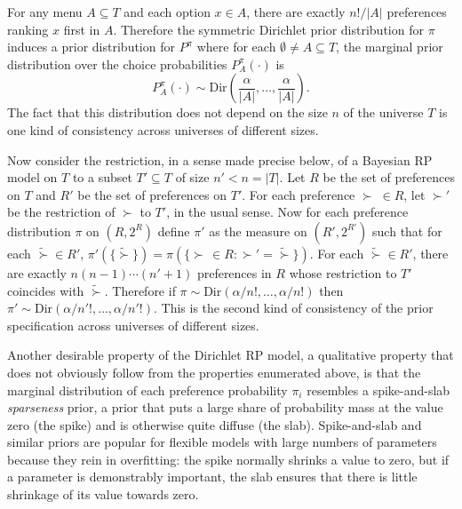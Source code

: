 \documentclass[11pt,letter]{article}
\newcommand{\Dpi}{Dirichlet RP model}
\begin{document}
For any menu $A \subseteq T$ and each option $x \in A$, there are exactly $n!/|A|$ preferences ranking $x$ first in $A$.
Therefore the symmetric Dirichlet prior distribution for $\pi$ induces a prior distribution for $P^\pi$ where for each $\emptyset \neq A \subseteq T$, the marginal prior distribution over the choice probabilities $P^\pi_A(\cdot)$ is
\begin{equation}\label{e:DirP}
  P^\pi_A(\cdot) \sim \mathrm{Dir}\left( \frac{\alpha}{|A|}, \ldots, \frac{\alpha}{|A|} \right).
\end{equation}
The fact that this distribution does not depend on the size $n$ of the universe $T$ is one kind of consistency across universes of different sizes.

Now consider the restriction, in a sense made precise below, of a Bayesian RP model on $T$ to a subset $T' \subseteq T$ of size $n' < n = |T|$.
Let $R$ be the set of preferences on $T$ and $R'$ be the set of preferences on $T'$.
For each preference $\succ\;\in R$, let $\succ'$ be the restriction of $\succ$ to $T'$, in the usual sense.
Now for each preference distribution $\pi$ on $(R,2^R)$ define $\pi'$ as the measure on $(R',2^{R'})$ such that for each $\tilde{\succ} \in R'$, $\pi'(\{\tilde{\succ}\}) = \pi(\{\succ\, \in R \colon \succ' = \tilde{\succ}\})$.
For each $\tilde{\succ} \in R'$, there are exactly $n(n-1)\cdots(n'+1)$ preferences in $R$ whose restriction to $T'$ coincides with $\tilde{\succ}$.
Therefore if $\pi \sim \mathrm{Dir}(\alpha/n!,\ldots,\alpha/n!)$ then $\pi' \sim \mathrm{Dir}(\alpha/n'!,\ldots,\alpha/n'!)$.
This is the second kind of consistency of the prior specification across universes of different sizes.

Another desirable property of the \Dpi{}, a qualitative property that does not obviously follow from the properties enumerated above, is that the marginal distribution of each preference probability $\pi_i$ resembles a spike-and-slab {\em sparseness} prior, a prior that puts a large share of probability mass at the value zero (the spike) and is otherwise quite diffuse (the slab).
Spike-and-slab and similar priors are popular for flexible models with large numbers of parameters because they rein in overfitting: the spike normally shrinks a value to zero, but if a parameter is demonstrably important, the slab ensures that there is little shrinkage of its value towards zero.
\end{document}

